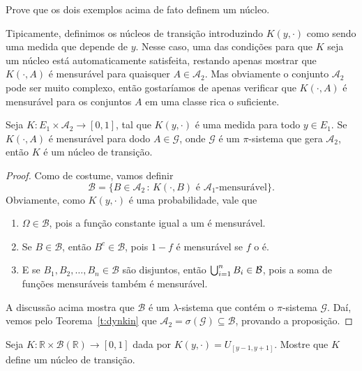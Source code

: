 \begin{exercise}
  Prove que os dois exemplos acima de fato definem um núcleo.
\end{exercise}

Tipicamente, definimos os núcleos de transição introduzindo $K(y, \cdot)$ como sendo uma medida que depende de $y$.
Nesse caso, uma das condições para que $K$ seja um núcleo está automaticamente satisfeita, restando apenas mostrar que $K(\cdot, A)$ é mensurável para quaisquer $A \in \mathcal{A}_2$.
Mas obviamente o conjunto $\mathcal{A}_2$ pode ser muito complexo, então gostaríamos de apenas verificar que $K(\cdot, A)$ é mensurável para os conjuntos $A$ em uma classe rica o suficiente.

\begin{proposition}
  \label{p:K_nucleo_na_classe}
  Seja $K:E_1 \times \mathcal{A}_2 \to [0,1]$, tal que $K(y, \cdot)$ é uma medida para todo $y \in E_1$.
  Se $K(\cdot, A)$ é mensurável para dodo $A \in \mathcal{G}$, onde $\mathcal{G}$ é um $\pi$-sistema que gera $\mathcal{A}_2$, então $K$ é um núcleo de transição.
\end{proposition}

\begin{proof}
  Como de costume, vamos definir
  \begin{equation}
    \mathcal{B} = \{B \in \mathcal{A}_2\, : \, K(\cdot, B) \text{ é $\mathcal{A}_1$-mensurável}\}.
  \end{equation}
  Obviamente, como $K(y, \cdot)$ é uma probabilidade, vale que
  \begin{enumerate}[\quad a)]
  \item $\Omega \in \mathcal{B}$, pois a função constante igual a um é mensurável.
  \item Se $B \in \mathcal{B}$, então $B^c \in \mathcal{B}$, pois $1 - f$ é mensurável se $f$ o é.
  \item E se $B_1, B_2,\dots, B_n \in \mathcal{B}$ são disjuntos, então $\operatorname*{{\textstyle \bigcup}}_{i=1}^n B_i \in \mathcal{B}$, pois a soma de funções mensuráveis também é mensurável.
  \end{enumerate}

  A discussão acima mostra que $\mathcal{B}$ é um $\lambda$-sistema que contém o $\pi$-sistema $\mathcal{G}$.
  Daí, vemos pelo Teorema~\ref{t:dynkin} que $\mathcal{A}_2 = \sigma(\mathcal{G}) \subseteq \mathcal{B}$, provando a proposição.
\end{proof}

\begin{exercise}
  Seja $K:\mathbb{R} \times \mathcal{B}(\mathbb{R}) \to [0,1]$ dada por $K(y, \cdot) = U_{[y - 1,y + 1]}$.
  Mostre que $K$ define um núcleo de transição.
\end{exercise}

